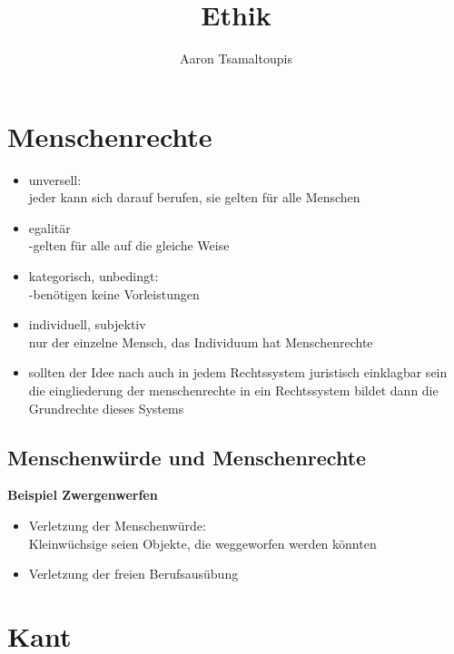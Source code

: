 \documentclass[12pt, letterpaper]{article}
\title{Ethik}
\author{Aaron Tsamaltoupis}
\begin{document}
\maketitle
\tableofcontents
\newpage

\newpage
\section{Menschenrechte}
\label{sec:Menschenrechte}
\begin{itemize}
	\item unversell:
		\\jeder kann sich darauf berufen, sie gelten für alle Menschen
	\item egalitär\\
		-gelten für alle auf die gleiche Weise
	\item kategorisch, unbedingt:\\
		-benötigen keine Vorleistungen
	\item individuell, subjektiv\\
		nur der einzelne Mensch, das Individuum hat Menschenrechte
	\item sollten der Idee nach auch in jedem Rechtssystem juristisch einklagbar sein\\
		die eingliederung der menschenrechte in ein Rechtssystem bildet dann die Grundrechte dieses Systems
\end{itemize}
\subsection{Menschenwürde und Menschenrechte}
\label{sec:Menschenwürde und Menschenrechte}
\textbf{Beispiel Zwergenwerfen}	\\
\begin{itemize}
	\item Verletzung der Menschenwürde:\\
		Kleinwüchsige seien Objekte, die weggeworfen werden könnten
	\item Verletzung der freien Berufsausübung
\end{itemize}

\newpage
\section{Kant}
\end{document}
